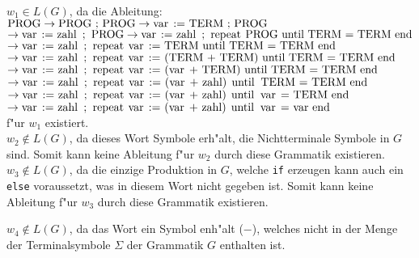 \documentclass[a4paper,12pt]{article}
\begin{document}

$ w_1 \in L(G) $, da die Ableitung: \\
$ \text{\lstinline|PROG|} \rightarrow \text{\lstinline|PROG ; PROG|} \rightarrow \text{\lstinline|var := TERM ; PROG|} $ \\
$ \rightarrow \text{\lstinline|var := zahl ; PROG|} \rightarrow \text{\lstinline|var := zahl ; repeat PROG until TERM = TERM end|} $ \\
$ \rightarrow \text{\lstinline|var := zahl ; repeat var := TERM until TERM = TERM end |} $ \\
$ \rightarrow \text{\lstinline|var := zahl ; repeat var := (TERM + TERM) until TERM = TERM end |}  $ \\
$ \rightarrow \text{\lstinline|var := zahl ; repeat var := (var + TERM) until TERM = TERM end |}  $ \\
$ \rightarrow \text{\lstinline|var := zahl ; repeat var := (var + zahl) until TERM = TERM end |}  $ \\
$ \rightarrow \text{\lstinline|var := zahl ; repeat var := (var + zahl) until var = TERM end |}  $ \\
$ \rightarrow \text{\lstinline|var := zahl ; repeat var := (var + zahl) until var = var end |}  $ \\
f"ur $ w_1 $ existiert. \\ 

$ w_2 \notin L(G) $, da dieses Wort Symbole erh"alt, die Nichtterminale Symbole in  $ G $ sind. 
Somit kann keine Ableitung f"ur $ w_2 $ durch diese Grammatik existieren. \\

$ w_3 \notin L(G) $, da die einzige Produktion in $ G $, welche \lstinline|if| erzeugen kann auch ein \lstinline|else| voraussetzt, was in diesem Wort nicht gegeben ist.
Somit kann keine Ableitung f"ur $ w_3 $ durch diese Grammatik existieren.

\newpage

$ w_4 \notin L(G) $, da das Wort ein Symbol enh"alt ($ - $), welches nicht in der Menge der Terminalsymbole $ \Sigma $ der Grammatik $ G $ enthalten ist.
\end{document}
